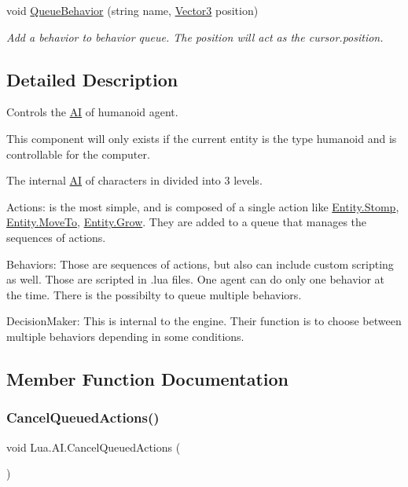 \begin{DoxyCompactItemize}
void \mbox{\hyperlink{class_lua_1_1_a_i_ad04e867b1b20eefaa0f4d60af5a9422c}{Queue\+Behavior}} (string name, \mbox{\hyperlink{class_lua_1_1_vector3}{Vector3}} position)
\begin{DoxyCompactList}\small\item\em Add a behavior to behavior queue. The position will act as the cursor.\+position. \end{DoxyCompactList}\end{DoxyCompactItemize}


\subsection{Detailed Description}
Controls the \mbox{\hyperlink{class_lua_1_1_a_i}{AI}} of humanoid agent. 

This component will only exists if the current entity is the type humanoid and is controllable for the computer.

The internal \mbox{\hyperlink{class_lua_1_1_a_i}{AI}} of characters in divided into 3 levels.

Actions\+: is the most simple, and is composed of a single action like \mbox{\hyperlink{class_lua_1_1_entity_a0a8058c8b504215e492471b4e7d557d4}{Entity.\+Stomp}}, \mbox{\hyperlink{class_lua_1_1_entity_a5d6cfb68967adf948db2b6c09d7dfd38}{Entity.\+Move\+To}}, \mbox{\hyperlink{class_lua_1_1_entity_a92feb21c4219c60a7e5935733302083f}{Entity.\+Grow}}. They are added to a queue that manages the sequences of actions.

Behaviors\+: Those are sequences of actions, but also can include custom scripting as well. Those are scripted in .lua files. One agent can do only one behavior at the time. There is the possibilty to queue multiple behaviors.

Decision\+Maker\+: This is internal to the engine. Their function is to choose between multiple behaviors depending in some conditions. 

\subsection{Member Function Documentation}
\mbox{\label{class_lua_1_1_a_i_acae3b8822867d658c5dc7c409af76e11}} 
\subsubsection{\texorpdfstring{CancelQueuedActions()}{CancelQueuedActions()}}
{\footnotesize\ttfamily void Lua.\+A\+I.\+Cancel\+Queued\+Actions (\begin{DoxyParamCaption}{ }\end{DoxyParamCaption})}



